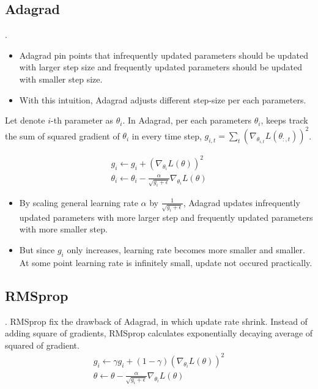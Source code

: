 \documentclass[8pt]{beamer}
\begin{document}
\subsection{Adagrad}
\begin{frame}{.}
    \begin{itemize}
        \item Adagrad pin points that infrequently updated parameters should be updated with larger step size and frequently updated parameters should be updated with smaller step size.
        \item With this intuition, Adagrad adjusts different step-size per each parameters.
    \end{itemize}

    Let denote $i$-th parameter as $\theta_{i}$. In Adagrad, per each parameters $\theta_i$, keeps track the sum of squared gradient of $\theta_{i}$ in every time step, $g_{i, t} = \sum_t (\nabla_{\theta_{i,t}} L(\theta_{:, t}))^2 $.

    \[
        \begin{gathered}
            g_{i} \leftarrow g_{i} + (\nabla_{\theta_{i}} L(\theta))^2 \\
            \theta_i \leftarrow \theta_i - \frac{\alpha}{\sqrt{g_i + \epsilon}} \nabla_{\theta_i} L(\theta)
        \end{gathered}
    \]

    \begin{itemize}
        \item By scaling general learning rate $\alpha$ by $\frac{1}{\sqrt{g_i + \epsilon}}$, Adagrad updates infrequently updated parameters with more larger step and frequently updated parameters with more smaller step.
        \item But since $g_i$ only increases, learning rate becomes more smaller and smaller. At some point learning rate is infinitely small, update not occured practically.
    \end{itemize}
\end{frame}

\subsection{RMSprop}
\begin{frame}{.}
    RMSprop fix the drawback of Adagrad, in which update rate shrink. Instead of adding square of gradients, RMSprop calculates exponentially decaying average of squared of gradient.
    \[
        \begin{gathered}
            g_i \leftarrow \gamma g_i  + (1- \gamma) (\nabla_{\theta_i} L(\theta))^2 \\
            \theta \leftarrow \theta - \frac{\alpha}{\sqrt{g_i + \epsilon}} \nabla_{\theta_i} L(\theta)
        \end{gathered}
    \]

\end{frame}
\end{document}
